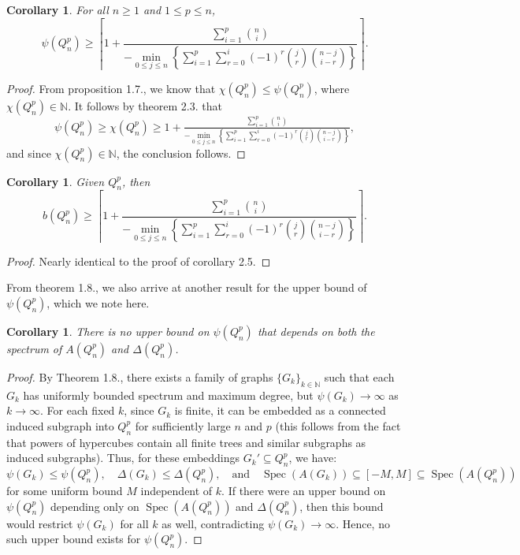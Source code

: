 \documentclass[12pt]{amsart}
\numberwithin{figure}{section}
\theoremstyle{plain}
\newtheorem{corollary}[theorem]{Corollary}
\begin{document}
\begin{corollary}
    For all $n\geq 1$ and $1\leq p\leq n$,
    \[\psi(Q_{n}^{p}) \geq \left\lceil1 +\dfrac{\sum_{i=1}^{p}\binom{n}{i}}{- \min\limits_{0\leq j\leq n}\left\{\sum_{i=1}^{p}\sum_{r=0}^{i}(-1)^{r}\binom{j}{r}\binom{n-j}{i-r}\right\}}\right\rceil.\]
\end{corollary}
\begin{proof}
    From proposition 1.7., we know that $\chi(Q_{n}^{p})\leq \psi(Q_{n}^{p})$, where $\chi(Q_{n}^{p})\in\mathbb{N}$. It follows by theorem 2.3. that
    \[\psi(Q_{n}^{p}) \geq \chi(Q_{n}^{p}) \geq 1 +\tfrac{\sum_{i=1}^{p}\binom{n}{i}}{- \min\limits_{0\leq j\leq n}\left\{\sum_{i=1}^{p}\sum_{r=0}^{i}(-1)^{r}\binom{j}{r}\binom{n-j}{i-r}\right\}},\]
    and since $\chi(Q_{n}^{p}) \in\mathbb{N}$, the conclusion follows.
\end{proof}
\begin{corollary}
    Given $Q_{n}^{p}$, then 
    \[b(Q_{n}^{p}) \geq \left\lceil1 +\dfrac{\sum_{i=1}^{p}\binom{n}{i}}{- \min\limits_{0\leq j\leq n}\left\{\sum_{i=1}^{p}\sum_{r=0}^{i}(-1)^{r}\binom{j}{r}\binom{n-j}{i-r}\right\}}\right\rceil.\]
\end{corollary}
\begin{proof}
    Nearly identical to the proof of corollary 2.5.
\end{proof}
\indent From theorem 1.8., we also arrive at another result for the upper bound of $\psi(Q_{n}^{p})$, which we note here.
\begin{corollary}
    There is no upper bound on $\psi(Q_{n}^{p})$ that depends on both the spectrum of $A(Q_{n}^{p})$ and $\Delta(Q_{n}^{p})$.
\end{corollary}
\begin{proof}
    By Theorem 1.8., there exists a family of graphs $\{G_{k}\}_{k\in\mathbb{N}}$ such that each $G_{k}$ has uniformly bounded spectrum and maximum degree, but $\psi(G_{k}) \to \infty$ as $k \to \infty$. For each fixed $k$, since $G_{k}$ is finite, it can be embedded as a connected induced subgraph into $Q_{n}^{p}$ for sufficiently large $n$ and $p$ (this follows from the fact that powers of hypercubes contain all finite trees and similar subgraphs as induced subgraphs). Thus, for these embeddings $G_{k}' \subseteq Q_{n}^{p}$, we have: 
    \[\psi(G_{k}) \leq \psi(Q_{n}^{p}), \quad \Delta(G_{k}) \leq \Delta(Q_{n}^{p}), \quad \text{and} \quad \operatorname{Spec}(A(G_{k})) \subseteq [-M, M] \subseteq \operatorname{Spec}(A(Q_{n}^{p}))\]
    for some uniform bound $M$ independent of $k$. If there were an upper bound on $\psi(Q_{n}^{p})$ depending only on $\operatorname{Spec}(A(Q_{n}^{p}))$ and $\Delta(Q_{n}^{p})$, then this bound would restrict $\psi(G_{k})$ for all $k$ as well, contradicting $\psi(G_{k}) \to \infty$. Hence, no such upper bound exists for $\psi(Q_{n}^{p})$.
\end{proof}
\end{document}
